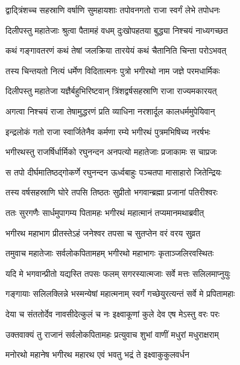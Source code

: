 \twolineshloka
{द्वाद्त्रिंशच्च सहस्राणि वर्षाणि सुमहायशाः}
{तपोवनगतो राजा स्वर्गं लेभे तपोधनः} %

\twolineshloka
{दिलीपस्तु महातेजाः श्रुत्वा पैतामहं वधम्}
{दुःखोपहतया बुद्ध्या निश्चयं नाध्यगच्छत} %

\twolineshloka
{कथं गङ्गावतरणं कथं तेषां जलक्रिया}
{तारयेयं कथं चैतानिति चिन्ता परोऽभवत्} %

\twolineshloka
{तस्य चिन्तयतो नित्यं धर्मेण विदितात्मनः}
{पुत्रो भगीरथो नाम जज्ञे परमधार्मिकः} %

\twolineshloka
{दिलीपस्तु महातेजा यज्ञैर्बहुभिरिष्टवान्}
{त्रिंशद्वर्षसहस्राणि राजा राज्यमकारयत्} %

\twolineshloka
{अगत्वा निश्चयं राजा तेषामुद्धरणं प्रति}
{व्याधिना नरशार्दूल कालधर्ममुपेयिवान्} %

\twolineshloka
{इन्द्रलोकं गतो राजा स्वार्जितेनैव कर्मणा}
{रम्ये भगीरथं पुत्रमभिषिच्य नरर्षभः} %

\twolineshloka
{भगीरथस्तु राजर्षिर्धार्मिको रघुनन्दन}
{अनपत्यो महातेजाः प्रजाकामः स चाप्रजः} %

\twolineshloka
{स तपो दीर्घमातिष्ठद्गोकर्णे रघुनन्दन}
{ऊर्ध्वबाहुः पञ्चतपा मासाहारो जितेन्द्रियः} %

\twolineshloka
{तस्य वर्षसहस्राणि घोरे तपसि तिष्ठतः}
{सुप्रीतो भगवान्ब्रह्मा प्रजानां पतिरीश्वरः} %

\twolineshloka
{ततः सुरगणैः सार्धमुपागम्य पितामहः}
{भगीरथं महात्मानं तप्यमानमथाब्रवीत्} %

\twolineshloka
{भगीरथ महाभाग प्रीतस्तेऽहं जनेश्वर}
{तपसा च सुतप्तेन वरं वरय सुव्रत} %

\twolineshloka
{तमुवाच महातेजाः सर्वलोकपितामहम्}
{भगीरथो महाभागः कृताञ्जलिरवस्थितः} %

\twolineshloka
{यदि मे भगवान्प्रीतो यद्यस्ति तपसः फलम्}
{सगरस्यात्मजाः सर्वे मत्तः सलिलमाप्नुयुः} %

\twolineshloka
{गङ्गायाः सलिलक्लिन्ने भस्मन्येषां महात्मनाम्}
{स्वर्गं गच्छेयुरत्यन्तं सर्वे मे प्रपितामहाः} %

\twolineshloka
{देया च संततोर्देव नावसीदेत्कुलं च नः}
{इक्ष्वाकूणां कुले देव एष मेऽस्तु वरः परः} %

\twolineshloka
{उक्तवाक्यं तु राजानं सर्वलोकपितामहः}
{प्रत्युवाच शुभां वाणीं मधुरां मधुराक्षराम्} %

\twolineshloka
{मनोरथो महानेष भगीरथ महारथ}
{एवं भवतु भद्रं ते इक्ष्वाकुकुलवर्धन} %

